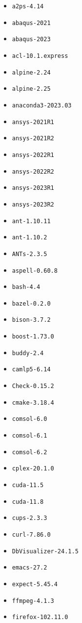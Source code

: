 \scriptsize
\begin{multicols}{3}
\begin{itemize}
\item \verb|a2ps-4.14|
\item \verb|abaqus-2021|
\item \verb|abaqus-2023|
\item \verb|acl-10.1.express|
\item \verb|alpine-2.24|
\item \verb|alpine-2.25|
\item \verb|anaconda3-2023.03|
\item \verb|ansys-2021R1|
\item \verb|ansys-2021R2|
\item \verb|ansys-2022R1|
\item \verb|ansys-2022R2|
\item \verb|ansys-2023R1|
\item \verb|ansys-2023R2|
\item \verb|ant-1.10.11|
\item \verb|ant-1.10.2|
\item \verb|ANTs-2.3.5|
\item \verb|aspell-0.60.8|
\item \verb|bash-4.4|
\item \verb|bazel-0.2.0|
\item \verb|bison-3.7.2|
\item \verb|boost-1.73.0|
\item \verb|buddy-2.4|
\item \verb|camlp5-6.14|
\item \verb|Check-0.15.2|
\item \verb|cmake-3.18.4|
\item \verb|comsol-6.0|
\item \verb|comsol-6.1|
\item \verb|comsol-6.2|
\item \verb|cplex-20.1.0|
\item \verb|cuda-11.5|
\item \verb|cuda-11.8|
\item \verb|cups-2.3.3|
\item \verb|curl-7.86.0|
\item \verb|DbVisualizer-24.1.5|
\item \verb|emacs-27.2|
\item \verb|expect-5.45.4|
\item \verb|ffmpeg-4.1.3|
\item \verb|firefox-102.11.0|

\end{itemize}
\end{multicols}
